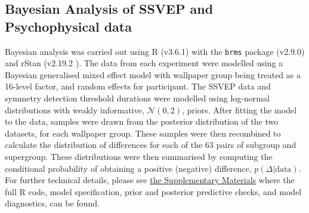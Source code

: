 \documentclass[11pt, twoside]{article}
\begin{document}
\subsection*{Bayesian Analysis of SSVEP and Psychophysical data}
Bayesian analysis was carried out using R (v3.6.1) \citep{R} with the \texttt{brms} package (v2.9.0) \citep{burkner2017} and rStan (v2.19.2 \citep{rStan}). The data from each experiment were modelled using a Bayesian generalised mixed effect model with wallpaper group being treated as a 16-level factor, and random effects for participant. The SSVEP data and symmetry detection threshold durations were modelled using log-normal distributions with weakly informative, $ \mathcal{N}(0, 2)$, priors. After fitting the model to the data, samples were drawn from the posterior distribution of the two datasets, for each wallpaper group. These samples were then recombined to calculate the distribution of differences for each of the 63 pairs of subgroup and supergroup. These distributions were then summarised by computing the conditional probability of obtaining a positive (negative) difference, $p(\Delta | \text{data})$. For further technical details, please see \href{https://osf.io/f3ex8/}{the Supplementary Materials} where the full R code, model specification, prior and posterior predictive checks, and model diagnostics, can be found. 

\begin{multicols}{2}
\small
 

\end{multicols}
\end{document}
